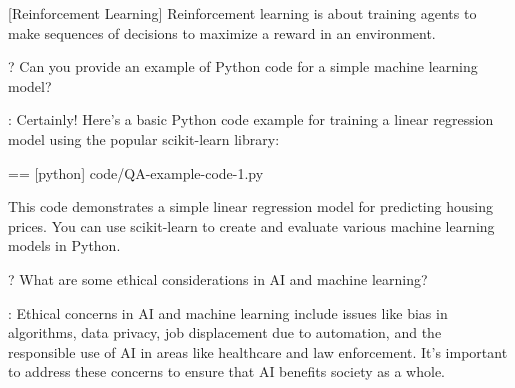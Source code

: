   [Reinforcement Learning]
    Reinforcement learning is about training agents to make sequences of decisions to maximize a reward in an environment.

?
  Can you provide an example of Python code for a simple machine learning model?

:
  Certainly! Here's a basic Python code example for training a linear regression model using the popular scikit-learn library:

  == [python] {code/QA-example-code-1.py}

  This code demonstrates a simple linear regression model for predicting housing prices. You can use scikit-learn to create and evaluate various machine learning models in Python.

?
  What are some ethical considerations in AI and machine learning?

:
  Ethical concerns in AI and machine learning include issues like bias in algorithms, data privacy, job displacement due to automation, and the responsible use of AI in areas like healthcare and law enforcement. It's important to address these concerns to ensure that AI benefits society as a whole.

